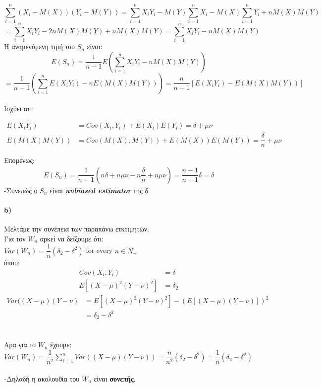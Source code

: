 \documentclass{article}
\begin{document}
$$
\sum_{i=1}^{n}(X_{i}-M(X))(Y_{i}-M(Y))=\sum_{i=1}^{n}X_{i}Y_{i}-M(Y)\sum_{i=1}^{n}X_{i}
-M(X)\sum_{i=1}^{n}Y_{i}+nM(X)M(Y)
$$
$$
=\sum_{i=1}^{n}X_{i}Y_{i}-2nM(X)M(Y)+nM(X)M(Y)=\sum_{i=1}^{n}X_{i}Y_{i}-nM(X)M(Y) 
$$
Η αναμενόμενη τιμή του $S_{n}$ είναι:\\
$$
Ε(S_{n})=\dfrac{1}{n-1}Ε(\sum_{i=1}^{n}X_{i}Y_{i}-nM(X)M(Y))
$$
$$
=\dfrac{1}{n-1}(\sum_{i=1}^{n}Ε(X_{i}Y_{i})-nE(M(X)M(Y)))=\dfrac{n}{n-1}[Ε(X_{i}Y_{i})-E(M(X)M(Y))]
$$
\\
Ισχύει οτι:

\begin{align*}
E(X_{i}Y_{i}) &= Cov(X_{i},Y_{i})+E(X_{i})E(Y_{i})=\delta+\mu\nu \\
E(M(X)M(Y)) &= Cov(M(X),M(Y))+E(M(X))E(M(Y))=\dfrac{\delta}{n}+\mu\nu
\end{align*}

Επομένως:
\begin{align*}
Ε(S_{n})= \dfrac{1}{n-1}(n\delta+n\mu\nu-n\dfrac{\delta}{n}+n\mu\nu)=\dfrac{n-1}{n-1}\delta=\delta
\end{align*}
-Συνεπώς ο $S_{n}$ είναι \emph{\textbf{unbiased estimator}} της δ.

\paragraph{b)}
Μελτάμε την συνέπεια των παραπάνω ετκτιμητών.\\
Για τον $W_{n}$ αρκεί να δείξουμε ότι:\\

$Var(W_{n})=\dfrac{1}{n}(\delta_{2}-\delta^{2})$ for every $ n\in N_{+}$ \\
όπου:
\begin{align*}
Cov(X_{i},Y_{i}) &= \delta \\
E[(X-\mu)^{2}(Y-\nu)^{2}] &=\delta_{2}
\end{align*}
\begin{align*}
Var((X-\mu)(Y-\nu)&=E[(X-\mu)^{2}(Y-\nu)^{2}]- (E[(X-\mu)(Y-\nu)])^{2}\\
 &=\delta_{2}-\delta^{2}
\end{align*}
\\
\\
Αρα για το $W_{n}$ έχουμε:\\ $Var(W_{n})=\dfrac{1}{n^{2}}\sum_{i=1}^{n}Var((X-\mu)(Y-\nu))=\dfrac{n}{n^{2}}(\delta_{2}-\delta^{2})=\dfrac{1}{n}(\delta_{2}-\delta^{2})$
\\
\\
-Δηλαδή η ακολουθία του $W_{n}$ είναι \textbf{συνεπής}.\\
\end{document}
